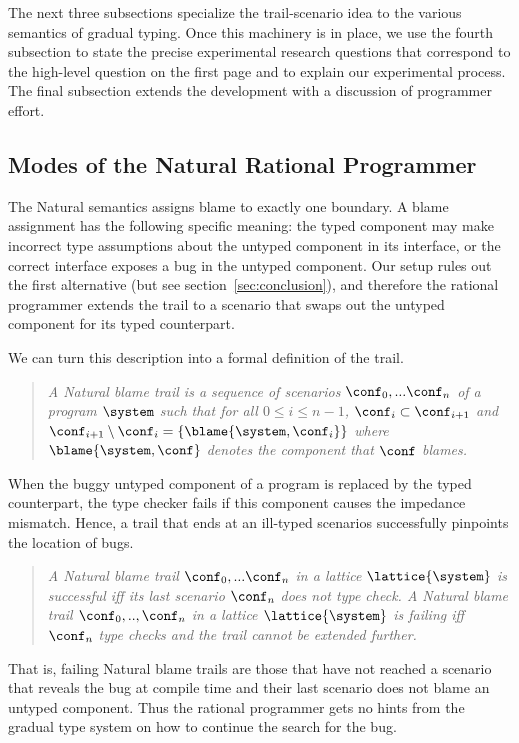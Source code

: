 
The next three subsections specialize the trail-scenario idea to the
various semantics of gradual typing. Once this machinery is in place,
we use the fourth subsection to state the precise experimental
research questions that correspond to the high-level question on the
first page and to explain our experimental process. The final
subsection extends the development with a discussion of programmer effort. 


\subsection{Modes of the Natural Rational Programmer} \label{sub:natural}

The Natural semantics assigns blame to exactly one boundary.  A blame assignment
has the following specific meaning: the typed component may make incorrect type
assumptions about the untyped component in its interface, or the correct
interface exposes a bug in the untyped component. Our setup rules out the first
alternative (but see section~\ref{sec:conclusion}), and therefore the rational
programmer extends the trail to a scenario that swaps out the untyped component
for its typed counterpart.

We can turn this description into a formal definition of the trail. 
\begin{quote}
\it A \emph{Natural blame trail} is a sequence of scenarios $\conf_0,...\conf_n$ of
a program $\system$ such that for all $0 \leq i \leq n - 1$, $\conf_i \subset
\conf_{i+1}$ and $\conf_{i+1} \setminus \conf_i =\{\blame{\system, \conf_i}\}$ where
$\blame{\system, \conf}$ denotes the component that $\conf$ blames.
\end{quote}

When the buggy untyped component of a program is replaced by the typed counterpart,
the type checker fails if this component causes the impedance mismatch. Hence, a
trail that ends at an ill-typed scenarios successfully pinpoints the location of
bugs. 
\begin{quote}
\it A Natural blame trail $\conf_0,...\conf_n$ in a lattice $\lattice{\system}$ is
\emph{successful} iff its last scenario $\conf_n$ does not type check.  A Natural
blame trail $\conf_0,..,\conf_n$ in a lattice $\lattice{\system}$ is \emph{failing}
iff $\conf_n$ type checks and the trail cannot be extended further.
\end{quote}
That is, failing Natural blame trails are those that have not reached a scenario that
reveals the bug at compile time and their last scenario does not blame an untyped component. Thus
the rational programmer gets no hints from the gradual type system on how to
continue the search for the bug.

